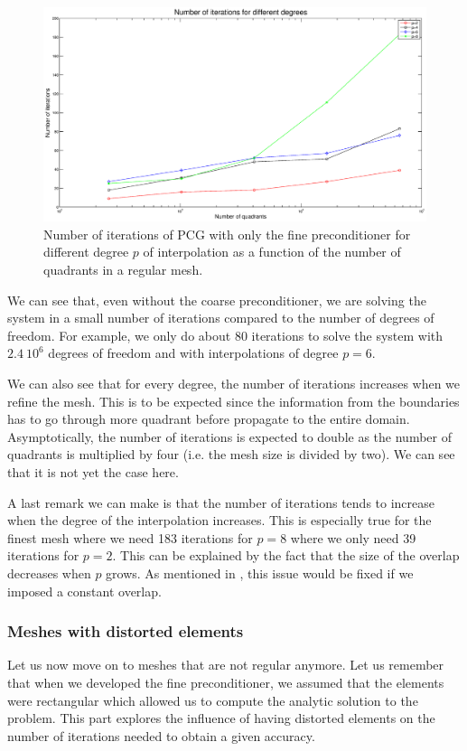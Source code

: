 \begin{figure}
\centering
\includegraphics[scale=0.35]{Results/fine_reg_iter.eps}
\caption{Number of iterations of PCG with only the fine preconditioner for different degree $p$ of interpolation as a function of the number of quadrants in a regular mesh.}
\label{fine_reg_iter} 
\end{figure}

We can see that, even without the coarse preconditioner, we are solving the system in a small number of iterations compared to the number of degrees of freedom. For example, we only do about 80 iterations to solve the system with $2.4\: 10^{6}$ degrees of freedom and with interpolations of degree $p=6$. 

 We can also see that for every degree, the number of iterations increases when we refine the mesh. This is to be expected since the information from the boundaries has to go through more quadrant before propagate to the entire domain. Asymptotically, the number of iterations is expected to double as the number of quadrants is multiplied by four (i.e. the mesh size is divided by two). We can see that it is not yet the case here.

A last remark we can make is that the number of iterations tends to increase when the degree of the interpolation increases. This is especially true for the finest mesh where we need 183 iterations for $p=8$ where we only need 39 iterations for $p=2$. This can be explained by the fact that the size of the overlap decreases when $p$ grows. As mentioned in \cite{overlap_constant}, this issue would be fixed if we imposed a constant overlap.

\subsubsection{Meshes with distorted elements}
Let us now move on to meshes that are not regular anymore. Let us remember that when we developed the fine preconditioner, we assumed that the elements were rectangular which allowed us to compute the analytic solution to the problem. This part explores the influence of having distorted elements on the number of iterations needed to obtain a given accuracy. 

